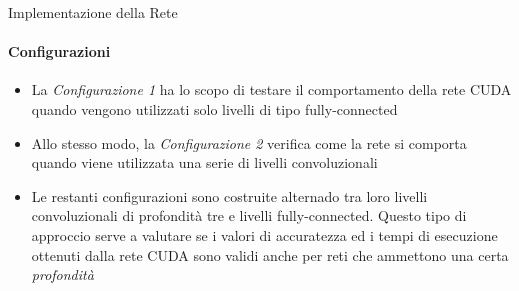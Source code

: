 \documentclass[
 ]{beamer}
\begin{document}
\begin{frame}{Implementazione della Rete}
    \framesubtitle{Configurazioni}

    \begin{itemize} [<+->]
        \setlength\itemsep{2em}
        \item \large La \emph{Configurazione 1} ha lo scopo di testare il comportamento della rete CUDA quando vengono utilizzati solo livelli di tipo fully-connected
        \item \large Allo stesso modo, la \emph{Configurazione 2} verifica come la rete si comporta quando viene utilizzata una serie di livelli convoluzionali    
        \item \large Le restanti configurazioni sono costruite alternado tra loro livelli convoluzionali di profondità tre e livelli fully-connected. Questo tipo di approccio serve a valutare se i valori di accuratezza ed i tempi di esecuzione ottenuti dalla rete CUDA sono validi anche per reti che ammettono una certa \emph{profondità}
    \end{itemize}     
\end{frame}

\end{document}

